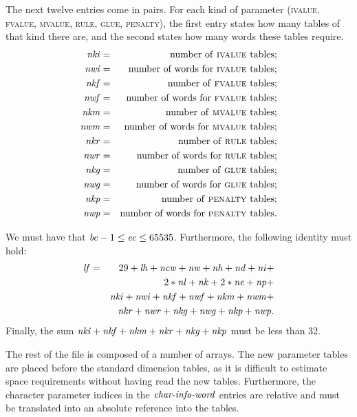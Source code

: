 \documentclass[fleqn]{article}
\newcommand{\myit}[1]{\mbox{\emph{#1}}}
\begin{document}
The next twelve entries come in pairs.
For each kind of parameter (\textsc{ivalue}, \textsc{fvalue},
\textsc{mvalue}, \textsc{rule}, \textsc{glue}, \textsc{penalty}),
the first entry states how many tables of that kind there are,
and the second states how many words these tables require.
\begin{eqnarray*}
\myit{nki} & = & \mbox{number of \textsc{ivalue} tables}; \\
\myit{nwi} & = & \mbox{number of words for \textsc{ivalue} tables}; \\
\myit{nkf} & = & \mbox{number of \textsc{fvalue} tables}; \\
\myit{nwf} & = & \mbox{number of words for \textsc{fvalue} tables}; \\
\myit{nkm} & = & \mbox{number of \textsc{mvalue} tables}; \\
\myit{nwm} & = & \mbox{number of words for \textsc{mvalue} tables}; \\
\myit{nkr} & = & \mbox{number of \textsc{rule} tables}; \\
\myit{nwr} & = & \mbox{number of words for \textsc{rule} tables}; \\
\myit{nkg} & = & \mbox{number of \textsc{glue} tables}; \\
\myit{nwg} & = & \mbox{number of words for \textsc{glue} tables}; \\
\myit{nkp} & = & \mbox{number of \textsc{penalty} tables}; \\
\myit{nwp} & = & \mbox{number of words for \textsc{penalty} tables}.
\end{eqnarray*}

We must have that $\myit{bc}-1\leq \myit{ec}\leq 65535$.
Furthermore, the following identity must hold:
\begin{eqnarray*}
\myit{lf} & = &
29 + \myit{lh} + \myit{ncw} +
\myit{nw} + \myit{nh} + \myit{nd} + \myit{ni} +\\
& & 2*\myit{nl} + \myit{nk} + 2*\myit{ne} + \myit{np} +\\
& & \myit{nki} + \myit{nwi} +
\myit{nkf} + \myit{nwf} +
\myit{nkm} + \myit{nwm} +\\
& & \myit{nkr} + \myit{nwr} +
\myit{nkg} + \myit{nwg} +
\myit{nkp} + \myit{nwp}.
\end{eqnarray*}
Finally, the sum
$\myit{nki}+ \myit{nkf}+ \myit{nkm}+
\myit{nkr}+ \myit{nkg}+ \myit{nkp}$
must be less than 32.

The rest of the file is composed of a number of arrays.  The new parameter
tables are placed before the standard dimension tables, as it is difficult
to estimate space requirements without having read the new tables.
Furthermore, the character parameter indices in the $\myit{char-info-word}$
entries are relative and must be translated into an absolute reference
into the tables.
\end{document}
